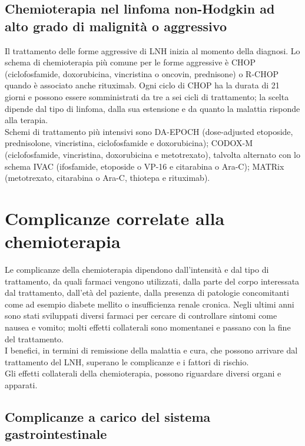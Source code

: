 \subsection{Chemioterapia nel linfoma non-Hodgkin ad alto grado di malignità o aggressivo}

Il trattamento delle forme aggressive di LNH inizia al momento della diagnosi. 
Lo schema di chemioterapia più comune per le forme aggressive è CHOP (ciclofosfamide, doxorubicina, vincristina 
o oncovin, prednisone) o R-CHOP quando è associato anche rituximab. Ogni ciclo di CHOP ha la durata di 21 giorni e 
possono essere somministrati da tre a sei cicli di trattamento; la scelta dipende dal tipo di linfoma, dalla sua estensione 
e da quanto la malattia risponde alla terapia.\\
Schemi di trattamento più intensivi sono DA-EPOCH (dose-adjusted etoposide, prednisolone, vincristina, ciclofosfamide 
e doxorubicina); CODOX-M (ciclofosfamide, vincristina, doxorubicina e metotrexato), talvolta alternato con lo schema 
IVAC (ifosfamide, etoposide o VP-16 e citarabina o Ara-C); MATRix (metotrexato, citarabina o Ara-C, 
thiotepa e rituximab)\cite{HIGHGRADE}.

\section{Complicanze correlate alla chemioterapia}

Le complicanze della chemioterapia dipendono dall’intensità e dal tipo di trattamento, da 
quali farmaci vengono utilizzati, dalla parte del corpo interessata dal trattamento, dall’età del paziente, dalla 
presenza di patologie concomitanti come ad esempio diabete mellito o insufficienza renale cronica. Negli ultimi anni 
sono stati sviluppati diversi farmaci per cercare di controllare sintomi come nausea e vomito; molti 
effetti collaterali sono momentanei e passano con la fine del trattamento.\\ I benefici, in termini di remissione 
della malattia e cura, che possono arrivare dal trattamento del LNH, superano le complicanze e i fattori di rischio\cite{LLS}.\\
Gli effetti collaterali della chemioterapia, possono riguardare diversi organi e apparati.

\subsection{Complicanze a carico del sistema gastrointestinale}

